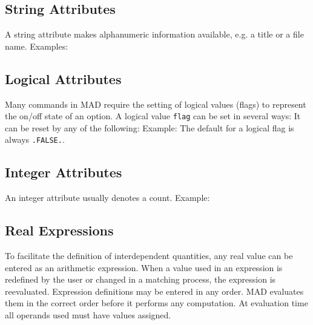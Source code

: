 \subsection{String Attributes}
\label{S-STRAT}
A string attribute makes alphanumeric information available,
e.g. a title or a file name.
Examples:
 
\subsection{Logical Attributes}
\label{S-LOGAT}
Many commands in MAD require the setting of logical values (flags)
to represent the on/off state of an option.
A logical value {\tt flag} can be set in several ways:
It can be reset by any of the following:
Example:
The default for a logical flag is always {\tt .FALSE.}.
 
\subsection{Integer Attributes}
\label{S-INTAT}
An integer attribute usually denotes a count.
Example:
 
\subsection{Real Expressions}
\label{S-FLTAT}
To facilitate the definition of interdependent quantities,
any real value can be entered as an arithmetic expression.
When a value used in an expression is redefined by the user
or changed in a matching process,
the expression is reevaluated.
Expression definitions may be entered in any order.
MAD evaluates them in the correct order before it performs
any computation.
At evaluation time all operands used must have values assigned.
 

